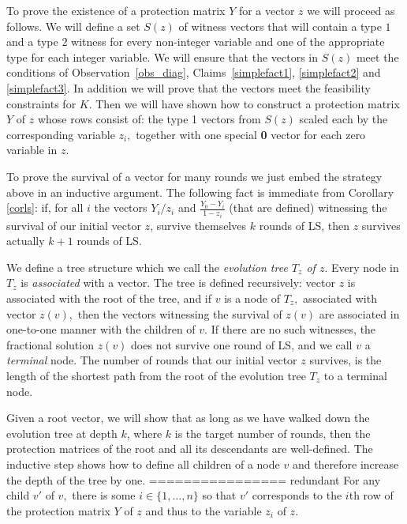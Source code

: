 \documentclass[11pt]{article}\usepackage{amsmath}
\begin{document}
To prove the existence of a  protection matrix $Y$ for a vector $z$ we
will proceed as follows. We will define a set $S(z)$ of witness
vectors that  will contain a type $1$  and a type $2$  witness for every
non-integer variable and  one of the appropriate type  for each 
integer  variable. We  will ensure  that the  vectors in  $S(z)$  meet the
conditions of Observation~\ref{obs_diag}, Claims~\ref{simplefact1},
\ref{simplefact2}  and \ref{simplefact3}. In  addition  we will prove 
that the vectors
meet the  feasibility constraints for $K.$ Then 
we will have shown how to  construct  a protection matrix $Y$ of $z$ whose rows
consist of: 
the type  1 vectors  from $S(z)$ scaled each  by the  corresponding variable
$z_i,$ together with  one special {\bf  0} vector  for each zero variable in $z.$



To prove  the survival of a vector  for many rounds we  just embed the
strategy above in an inductive argument. 
The following fact  is immediate from Corollary
\ref{corls}:   if,   for   all   $i$   the   vectors   $Y_i/z_i$   and
$\frac{Y_0-Y_i}{1-z_i}$ (that are  defined) witnessing the survival of
our initial vector $z$, survive  themselves $k$ rounds of LS, then $z$
survives actually $k+1$ rounds of LS. 


We
define a tree structure which we 
call the  \emph{evolution tree $T_z$ of $z.$} Every node in $T_z$ is {\em
  associated} with a vector. The tree is defined 
recursively: vector $z$ is associated with the root of the tree, and if $v$ is a node
of $T_z,$ associated with vector $z(v),$  then  the vectors  witnessing the
survival of $z(v)$ 
are associated in one-to-one manner with the children 
of $v.$ If  there are no such witnesses,  the fractional solution $z(v)$  does
not survive one round of LS, and  we call $v$ a \emph{terminal} node. 
The number  of rounds  that our
initial vector $z$ survives, is the length of the shortest path from the root of
the evolution tree $T_z$  to a terminal node.


Given a root vector, we will show that as long as we have walked down the
evolution tree at depth $k$, where $k$  is the target number of rounds, then the
protection matrices of the root and all its descendants are well-defined. 
The inductive step shows how to define all children of a node $v$ and
therefore increase the depth of the tree by one. 
\iffalse ================ redundant
 For any child $v'$
of $v,$   there is some $i \in \{1,\ldots,n\}$ so that 
$v'$ corresponds to 
the $i$th row of the protection matrix $Y$ of $z$ and thus   to the
variable $z_i$ of $z.$   
\end{document}
